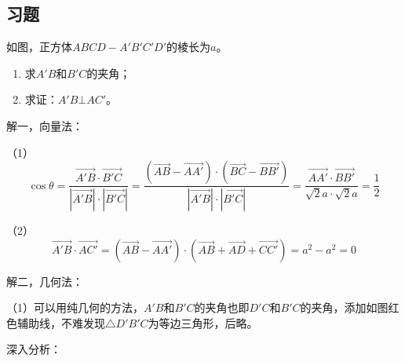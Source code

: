 \subsection{习题}

\begin{example}
如图，正方体$ABCD-A'B'C'D'$的棱长为$a$。
\begin{enumerate}
    \item 求$A'B$和$B'C$的夹角；
    \item 求证：$A'B\bot AC'$。
\end{enumerate}
\end{example}

\begin{figure}[h]
\centering
{}
\end{figure}

解一，向量法：

（1）
\[
\cos \theta =\frac{\overrightarrow{A'B}\cdot \overrightarrow{B'C}}{\left| \overrightarrow{A'B} \right|\cdot \left| \overrightarrow{B'C} \right|}=\frac{\left( \overrightarrow{AB}-\overrightarrow{AA'} \right) \cdot \left( \overrightarrow{BC}-\overrightarrow{BB'} \right)}{\left| \overrightarrow{A'B} \right|\cdot \left| \overrightarrow{B'C} \right|}=\frac{\overrightarrow{AA'}\cdot \overrightarrow{BB'}}{\sqrt{2}a\cdot \sqrt{2}a}=\frac{1}{2}
\]

（2）
\[
\overrightarrow{A'B}\cdot \overrightarrow{AC'}=\left( \overrightarrow{AB}-\overrightarrow{AA'} \right) \cdot \left( \overrightarrow{AB}+\overrightarrow{AD}+\overrightarrow{CC'} \right) =a^2-a^2=0
\]

解二，几何法：

（1）可以用纯几何的方法，$A'B$和$B'C$的夹角也即$D'C$和$B'C$的夹角，添加如图红色辅助线，不难发现$\bigtriangleup D'B'C$为等边三角形，后略。

深入分析：

